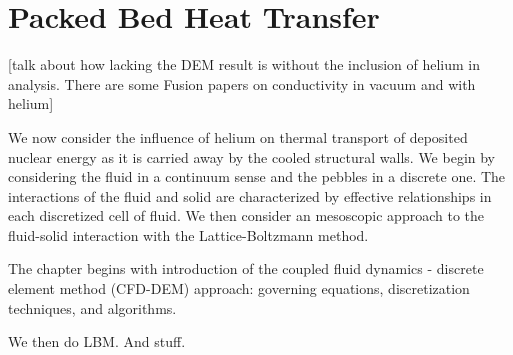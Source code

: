 \chapter{Packed Bed Heat Transfer} \label{ch:heat-transfer}
[talk about how lacking the DEM result is without the inclusion of helium in analysis. There are some Fusion papers on conductivity in vacuum and with helium]

We now consider the influence of helium on thermal transport of deposited nuclear energy as it is carried away by the cooled structural walls. We begin by considering the fluid in a continuum sense and the pebbles in a discrete one. The interactions of the fluid and solid are characterized by effective relationships in each discretized cell of fluid. We then consider an mesoscopic approach to the fluid-solid interaction with the Lattice-Boltzmann method. 

The chapter begins with introduction of the coupled fluid dynamics - discrete element method (CFD-DEM) approach: governing equations, discretization techniques, and algorithms.

We then do LBM. And stuff.


%
